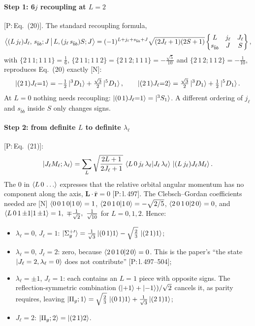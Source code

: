 \documentclass[11pt,a4paper]{article}
\newcommand{\tagP}[1]{\textcolor{blue!65!black}{\textsf{\small[P:\,#1]}}}
\newcommand{\tagN}{\textcolor{red!70!black}{\textsf{\small[N]}}}
\begin{document}
\paragraph{Step 1: 6$j$ recoupling at $L=2$} \tagP{Eq.~(20)}. The standard recoupling formula,
\begin{equation}
\Braket{(L\,j_\ell)J_\ell,\,s_{\bar bb};J\,\big|\,L,(j_\ell\,s_{\bar bb})S;J}=(-1)^{L+j_\ell+s_{\bar bb}+J}\sqrt{(2J_\ell+1)(2S+1)}\begin{Bmatrix}L&j_\ell&J_\ell\\ s_{\bar bb}&J&S\end{Bmatrix},
\end{equation}
with $\{2\,1\,1;1\,1\,1\}=\frac16$, $\{2\,1\,1;1\,1\,2\}=\{2\,1\,2;1\,1\,1\}=-\frac{\sqrt5}{10}$ and $\{2\,1\,2;1\,1\,2\}=-\frac1{10}$, reproduces Eq.~(20) exactly \tagN:
\begin{equation}
\ket{(2\,1)J_\ell{=}1}=-\tfrac12\ket{^3D_1}+\tfrac{\sqrt3}{2}\ket{^5D_1},\qquad
\ket{(2\,1)J_\ell{=}2}=\tfrac{\sqrt3}{2}\ket{^3D_1}+\tfrac12\ket{^5D_1}.
\end{equation}
At $L=0$ nothing needs recoupling: $\ket{(0\,1)J_\ell{=}1}=\ket{^3S_1}$. A different ordering of $j_\ell$ and $s_{\bar bb}$ inside $S$ only changes signs.

\paragraph{Step 2: from definite $L$ to definite $\lambda_\ell$} \tagP{Eq.~(21)}:
\begin{equation}
\ket{J_\ell M_\ell;\lambda_\ell}=\sum_L\sqrt{\frac{2L+1}{2J_\ell+1}}\,\braket{L\,0\,j_\ell\,\lambda_\ell|J_\ell\,\lambda_\ell}\,\ket{(L\,j_\ell)J_\ell M_\ell}.
\end{equation}
The $0$ in $\braket{L\,0\,\dots}$ expresses that the relative orbital angular momentum has no component along the axis, $\bm L\cdot\hat{\bm r}=0$ \tagP{l.\,497}. The Clebsch--Gordan coefficients needed are \tagN{} $\braket{0\,0\,1\,0|1\,0}=1$, $\braket{2\,0\,1\,0|1\,0}=-\sqrt{2/5}$, $\braket{2\,0\,1\,0|2\,0}=0$, and $\braket{L\,0\,1\,{\pm1}|1\,{\pm1}}=1,\ \mp\frac{1}{\sqrt2},\ \frac{1}{\sqrt{10}}$ for $L=0,1,2$. Hence:
\begin{itemize}
\item $\lambda_\ell=0$, $J_\ell=1$: $\ket{\Sigma_g^{+\prime}}=\frac{1}{\sqrt3}\ket{(0\,1)1}-\sqrt{\frac23}\,\ket{(2\,1)1}$;
\item $\lambda_\ell=0$, $J_\ell=2$: zero, because $\braket{2\,0\,1\,0|2\,0}=0$. This is the paper's ``the state $\ket{J_\ell=2,\lambda_\ell=0}$ does not contribute'' \tagP{l.\,497--504};
\item $\lambda_\ell=\pm1$, $J_\ell=1$: each contains an $L=1$ piece with opposite signs. The reflection-symmetric combination $(\ket{+1}+\ket{-1})/\sqrt2$ cancels it, as parity requires, leaving $\ket{\Pi_g;1}=\sqrt{\frac23}\,\ket{(0\,1)1}+\frac{1}{\sqrt3}\ket{(2\,1)1}$;
\item $J_\ell=2$: $\ket{\Pi_g;2}=\ket{(2\,1)2}$.
\end{itemize}
\end{document}

